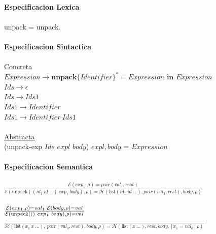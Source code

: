 \documentclass{article}
\begin{document}
\begin{itemize}
    \\
    \textbf{Especificacion Lexica}\\
    \\
    \hspace*{10mm} unpack = unpack.\\
    \\
    \textbf{Especificacion Sintactica}\\
    \\
    \hspace*{10mm} \underline{Concreta}\\
    \hspace*{10mm} $Expression\rightarrow\textbf{unpack}\{ Identifier \}^*=Expression\textbf{ in }Expression$\\
    \hspace*{10mm} $Ids\rightarrow\epsilon$\\
    \hspace*{10mm} $Ids\rightarrow Ids1$\\
    \hspace*{10mm} $Ids1\rightarrow Identifier$\\
    \hspace*{10mm} $Ids1\rightarrow Identifier\ Ids1$\\
    \\
    \hspace*{10mm} \underline{Abstracta}\\
    \hspace*{10mm} (unpack-exp $Ids$ $expl$ $body$)\hspace{10mm} $expl,body$ = $Expression$\\
    \\
    \textbf{Especificacion Semantica}\\
    \\
    \hspace*{10mm}
        $\frac
        {\mathcal{E}(exp_1,\rho)=pair(val_1,rest)}
        {\mathcal{E}(\text{unpack}((id_1\ id\ ...)\ exp_1\ body),\rho)=\mathcal{H}(\text{list}(id_1\ id\ ...),pair(val_1,rest),body,\rho)}$\\
    \\
    \hspace*{10mm}
        $\frac
        {\mathcal{E}(exp_1,\rho)=val_1\hspace{1mm}\mathcal{E}(body,\rho)=val}
        {\mathcal{E}(\text{unpack}(()\ exp_1\ body),\rho)=val}$
    \hspace*{10mm}
        $\frac
        {}
        {\mathcal{H}(\text{list}(x_1\ x\ ...),\ pair(val_0,rest),body,\rho)=\mathcal{H}(\text{list}(x\ ...),rest,body,[x_1=val_0]\rho)}$\\

\end{itemize}
\end{document}
